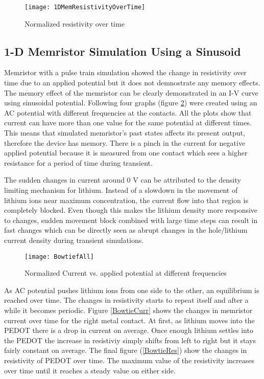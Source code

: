 {\begin{figure}[!htp]
\centering
\texttt{[image: 1DMemResistivityOverTime]}
\caption{Normalized resistivity over time} 
\label{MemResistivityTrain}
\end{figure}

\clearpage
\subsection{1-D Memristor Simulation Using a Sinusoid}

Memristor with a pulse train simulation showed the change in resistivity over time due to an applied potential but it does not demnostrate any memory effects. The memory effect of the memristor can be clearly demonstrated in an I-V curve using sinusoidal potential. Following four graphs (figure \ref{Bowtie}) were created using an AC potential with different frequencies at the contacts. All the plots show that current can have more than one value for the same potential at different times. This means that simulated memristor's past states affects its present output, therefore the device has memory. There is a pinch in the current for negative applied potential because it is measured from one contact which sees a higher resistance for a period of time during transient. 

The sudden changes in current around 0 V can be attributed to the density limiting mechanism for lithium. Instead of a slowdown in the movement of lithium ions near maximum concentration, the current flow into that region is completely blocked. Even though this makes the lithium density more responsive to changes, sudden movement block combined with large time steps can result in fast changes which can be directly seen as abrupt changes in the hole/lithium current density during transient simulations.  

\begin{figure}[!htp]
\centering
\texttt{[image: BowtiefAll]}
\caption{Normalized Current vs. applied potential at different frequencies} 
\label{Bowtie}
\end{figure}

As AC potential pushes lithium ions from one side to the other, an equilibrium is reached over time. The changes in resistivity starts to repeat itself and after a while it becomes  periodic. Figure \ref{BowtieCurr} shows the changes in memristor current over time for the right metal contact. At first, as lithium moves into the PEDOT there is a drop in current on average. Once enough lithium settles into the PEDOT the increase in resistiviy simply shifts from left to right but it stays fairly constant on average. The final figure (\ref{BowtieRes}) show the changes in resistivity of PEDOT over time. The maximum value of the resistivity increases over time until it reaches a steady value on either side.


}
